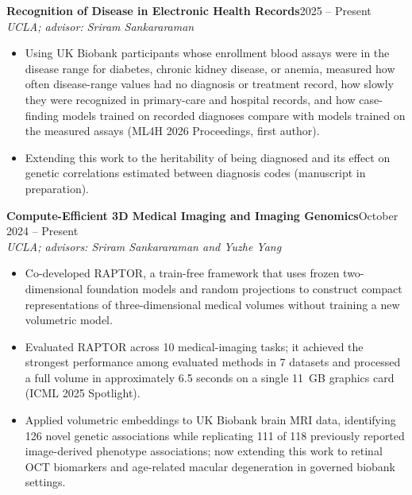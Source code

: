 \documentclass[10pt,letterpaper]{article}
\newcommand{\entry}[4]{\noindent\textbf{#1}\hfill #2\\ {\itshape #3}\hfill #4\par}
\begin{document}
\entry{Recognition of Disease in Electronic Health Records}{2025 -- Present}{UCLA; advisor: Sriram Sankararaman}{}
\begin{itemize}
\item Using UK Biobank participants whose enrollment blood assays were in the disease range for diabetes, chronic kidney disease, or anemia, measured how often disease-range values had no diagnosis or treatment record, how slowly they were recognized in primary-care and hospital records, and how case-finding models trained on recorded diagnoses compare with models trained on the measured assays (ML4H 2026 Proceedings, first author).
\item Extending this work to the heritability of being diagnosed and its effect on genetic correlations estimated between diagnosis codes (manuscript in preparation).
\end{itemize}

\entry{Compute-Efficient 3D Medical Imaging and Imaging Genomics}{October 2024 -- Present}{UCLA; advisors: Sriram Sankararaman and Yuzhe Yang}{}
\begin{itemize}
\item Co-developed RAPTOR, a train-free framework that uses frozen two-dimensional foundation models and random projections to construct compact representations of three-dimensional medical volumes without training a new volumetric model.
\item Evaluated RAPTOR across 10 medical-imaging tasks; it achieved the strongest performance among evaluated methods in 7 datasets and processed a full volume in approximately 6.5 seconds on a single 11~GB graphics card (ICML 2025 Spotlight).
\item Applied volumetric embeddings to UK Biobank brain MRI data, identifying 126 novel genetic associations while replicating 111 of 118 previously reported image-derived phenotype associations; now extending this work to retinal OCT biomarkers and age-related macular degeneration in governed biobank settings.
\end{itemize}
\end{document}
